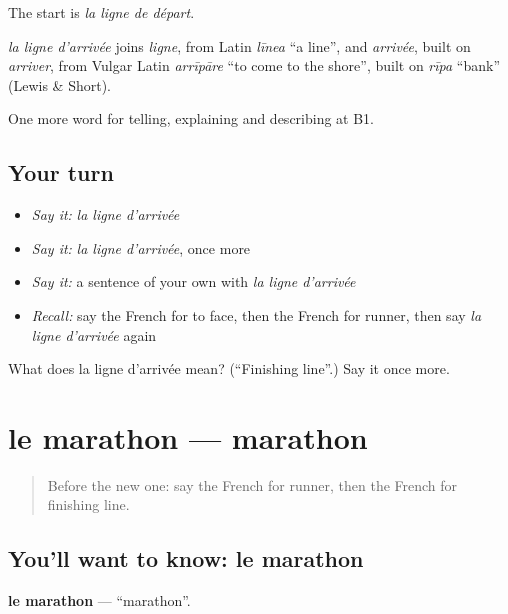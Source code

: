 The start is \emph{la ligne de départ}.

\begin{cousinweb}
\emph{la ligne d'arrivée} joins \emph{ligne}, from Latin \emph{līnea} \textquotedblleft{}a line\textquotedblright{}, and \emph{arrivée}, built on \emph{arriver}, from Vulgar Latin \emph{arrīpāre} \textquotedblleft{}to come to the shore\textquotedblright{}, built on \emph{rīpa} \textquotedblleft{}bank\textquotedblright{} (Lewis \& Short).
\end{cousinweb}

\begin{grammarlens}[title={What you've built}]
One more word for telling, explaining and describing at B1.
\end{grammarlens}

\subsection*{Your turn}
\begin{itemize}
\raggedright
  \item \emph{Say it:} \emph{la ligne d'arrivée}
  \item \emph{Say it:} \emph{la ligne d'arrivée}, once more
  \item \emph{Say it:} a sentence of your own with \emph{la ligne d'arrivée}
  \item \emph{Recall:} say the French for to face, then the French for runner, then say \emph{la ligne d'arrivée} again
\end{itemize}

\begin{tcolorbox}[breakable,colback=teal!4,colframe=teal!35!black,title={Before you move on}]
What does la ligne d'arrivée mean? (\textquotedblleft{}Finishing line\textquotedblright{}.) Say it once more.
\end{tcolorbox}
\section[le marathon]{le marathon — marathon}

\label{lesson:FR-C508-marathon}



\begin{quote}
Before the new one: say the French for runner, then the French for finishing line.
\end{quote}

\subsection*{You'll want to know: le marathon}
\textbf{le marathon} — \textquotedblleft{}marathon\textquotedblright{}.

